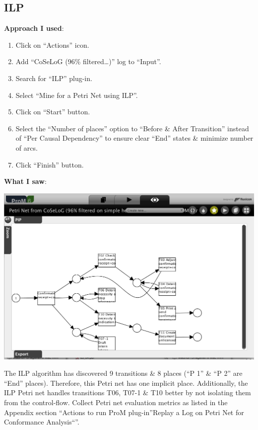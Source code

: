 \documentclass[]{article}
\begin{document}
\subsection{ILP}\label{ilp}

\textbf{Approach I used}:

\begin{enumerate}
\def\labelenumi{\arabic{enumi}.}
\itemsep1pt\parskip0pt
\item
  Click on ``Actions'' icon.
\item
  Add ``CoSeLoG (96\% filtered\ldots{})'' log to ``Input''.\\
\item
  Search for ``ILP'' plug-in.
\item
  Select ``Mine for a Petri Net using ILP''.
\item
  Click on ``Start'' button.
\item
  Select the ``Number of places'' option to ``Before \& After
  Transition'' instead of ``Per Causal Dependency'' to ensure clear
  ``End'' states \& minimize number of arcs.
\item
  Click ``Finish'' button.
\end{enumerate}

\textbf{What I saw}:

\includegraphics{CoSeLoG_Step_05_Filter96_PetriNet_ILP.png}

The ILP algorithm has discovered 9 transitions \& 8 places (``P 1'' \&
``P 2'' are ``End'' places). Therefore, this Petri net has one implicit
place. Additionally, the ILP Petri net handles transitions T06, T07-1 \&
T10 better by not isolating them from the control-flow. Collect Petri
net evaluation metrics as listed in the Appendix section ``Actions to
run ProM plug-in''Replay a Log on Petri Net for Conformance
Analysis``''.
\end{document}
